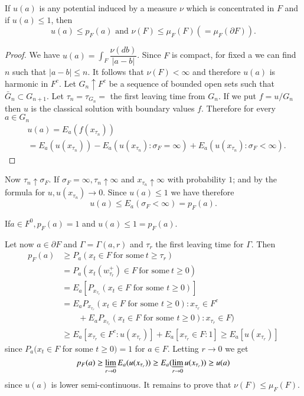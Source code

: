 \begin{thm}\label{chap3-sec6-thm2} %
  If $u(a)$ is any potential induced by a measure $\nu$ which is
  concentrated in $F$ and if $u(a) \leq 1$, then 
  $$
  u(a) \leq p_F (a) \text{ and } \nu (F) \le \mu_F (F) (= \mu_F (\partial F)).
  $$
\end{thm}

\begin{proof}
  We have $u(a) = \int_F \dfrac{\nu (db)}{|a -b|}$. Since $F$ is
  compact, for fixed a we can find $n$ such that $|a -b| \leq n$. It
  follows that $\nu (F) < \infty$ and therefore $u(a)$ is harmonic in
  $F^c$. Let $G_n \uparrow F^c$ be a sequence of bounded open sets
  such that $\bar{G}_n \subset G_{n + 1}$. Let $\tau_n = \tau_{G_n} =$
  the first leaving time from $G_n$. If we put $f = u/G_n$ then $u$ is
  the classical solution with boundary values $f$. Therefore for every
  $a \in G_n$ 
  \begin{align*}
&  u(a) = E_a(f(x_{\tau_n}))\\
& = E_a (u(x_{\tau_n})) - E_a (u(x_{\tau_n})
  : \sigma_F = \infty ) + E_a (u(x_{\tau_n}) : \sigma_F < \infty). 
  \end{align*}
\end{proof}

Now $\tau_n \uparrow \sigma_F$. If $\sigma_F = \infty , \tau_n
\uparrow \infty$ and $x_{\tau_n} \uparrow \infty$ with probability
$1$; and by the formula for $u , u (x_{\tau_n}) \rightarrow 0$. Since
$u(a) \leq 1$ we have therefore  
$$
u(a) \leq E_a (\sigma_F < \infty) = p_F(a). 
$$

If\pageoriginale $a \in F^0,  p_F(a) = 1$ and $u(a) \leq 1 = p_F(a)$.

Let now $a \in \partial F$ and $\Gamma = \Gamma (a,r)$ and $\tau_r$
the first leaving time for $\Gamma$. Then 
\begin{align*}
  p_F(a) & \geq P_a (x_t \in F ~\text{for some}~ t \geq \tau_r)\\ 
  & = P_a (x_t(w^+_{\tau_r}) \in F ~\text{for some}~ t \geq 0)\\
  & = E_a [ P_{x_{\tau_r}} (x_t \in F \text { for some } t \geq 0)] \\
  & = E_a  P_{x_{\tau_r}} (x_t \in F \text { for some } t \geq 0) :
  x_{\tau_r} \in F^c\\ 
  & \qquad +  E_a  P_{x_{\tau_r}} (x_t \in F \text { for
    some }t \geq 0) : x_{\tau_r} \in F) \\
  & \geq E_a  [ {x_{\tau_r}} \in F^c  : u(x_{\tau_r}) ] + E_a [x_{\tau_r}
  \in F : 1] \geq E_a [u (x_{\tau_r})] 
\end{align*}
since $P_a (x_t \in F$ for some $t \geq 0) = 1$ for $a \in F$. Letting
$r \rightarrow 0$ we get 
$$
p_F (a) \geq \varliminf_{r \rightarrow 0} E_a (u(x_{\tau_r})) \geq E_a
(\varliminf_{r \rightarrow 0} u(x_{\tau _r})) \geq u (a) 
$$
since $u(a)$ is lower semi-continuous. It remains to prove that $\nu
(F) \leq \mu_F (F)$. 

